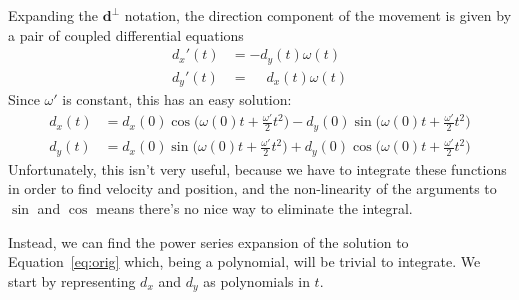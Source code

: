 \documentclass{report}
\begin{document}
Expanding the $\mathbf{d}^{\perp}$ notation,
the direction component of the movement is given by a pair of
coupled differential equations
\begin{equation} \label{eq:orig}
    \begin{aligned}
    d_x'(t) &= -d_y(t)\omega(t)\\
    d_y'(t) &= \phantom{-}d_x(t)\omega(t)
    \end{aligned}
\end{equation}
Since $\omega'$ is constant, this has an easy solution:
\newcommand*{\trigarg}{\Bigg(\omega(0) t + \frac{\omega'}{2} t^2 \Bigg)}
\begin{equation}
    \begin{aligned}
    d_x(t) &= d_x(0) \cos \trigarg - d_y(0) \sin \trigarg \\
    d_y(t) &= d_x(0) \sin \trigarg + d_y(0) \cos \trigarg
    \end{aligned}
\end{equation}
Unfortunately, this isn't very useful, because we have to integrate these
functions in order to find velocity and position, and the non-linearity of the arguments
to $\sin$ and $\cos$ means there's no nice way to eliminate the integral.

Instead, we can find the power series expansion of the solution to Equation~\ref{eq:orig}
which, being a polynomial, will be trivial to integrate. We start by representing $d_x$ and
$d_y$ as polynomials in $t$.
\end{document}
